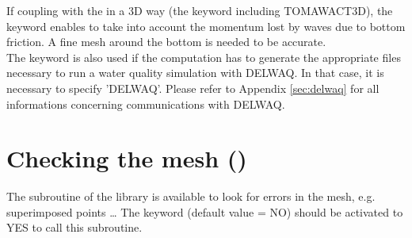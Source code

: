 If coupling with the \tomawac in a 3D way (the keyword 
including TOMAWACT3D), the keyword 
enables to take into account the momentum lost by waves due to
bottom friction.
A fine mesh around the bottom is needed to be accurate.\\

The keyword  is also used if the computation has to
generate the appropriate files necessary to run a water quality simulation with
DELWAQ. In that case, it is necessary to specify 'DELWAQ'. Please refer to Appendix \ref{sec:delwaq} for all informations
concerning communications with DELWAQ.

\section{Checking the mesh ()}

The  subroutine of the \bief library is available to look for
errors in the mesh, e.g. superimposed points \ldots
The keyword  (default value = NO) should be activated
to YES to call this subroutine.

